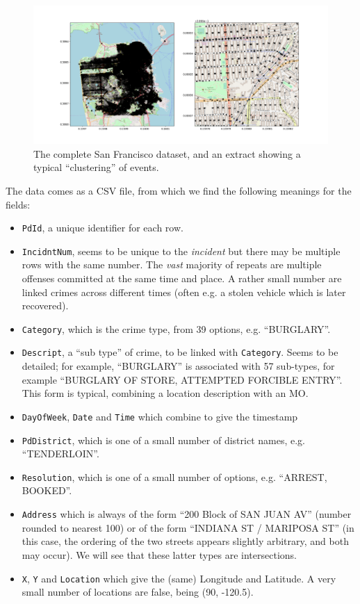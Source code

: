 \documentclass[twoside,a4paper,twocolumn,10pt]{article}
\theoremstyle{plain}
\theoremstyle{definition}
\begin{document}
\begin{figure}
  \includegraphics[width=\textwidth]{SF_overview.png}
  \caption{The complete San Francisco dataset, and an extract showing a typical ``clustering'' of events.}
  \label{fig:two}
\end{figure}

The data comes as a CSV file, from which we find the following meanings for the fields:
\begin{itemize}
\item \texttt{PdId}, a unique identifier for each row.
\item \texttt{IncidntNum}, seems to be unique to the \emph{incident} but there may be multiple
  rows with the same number.  The \emph{vast} majority of repeats are multiple offenses committed at the same time
  and place.  A rather small number are linked crimes across different times (often e.g. a stolen vehicle
  which is later recovered).
\item \texttt{Category}, which is the crime type, from 39 options, e.g. ``BURGLARY''.
\item \texttt{Descript}, a ``sub type'' of crime, to be linked with \texttt{Category}.
  Seems to be detailed; for example, ``BURGLARY'' is associated with 57 sub-types, for example
  ``BURGLARY OF STORE, ATTEMPTED FORCIBLE ENTRY''.  This form is typical, combining a location
  description with an MO.
\item \texttt{DayOfWeek}, \texttt{Date} and \texttt{Time} which combine to give the timestamp
\item \texttt{PdDistrict}, which is one of a small number of district names, e.g. ``TENDERLOIN''.
\item \texttt{Resolution}, which is one of a small number of options, e.g. ``ARREST, BOOKED''.
\item \texttt{Address} which is always of the form ``200 Block of SAN JUAN AV'' (number rounded to
  nearest 100) or of the form ``INDIANA ST / MARIPOSA ST'' (in this case, the ordering of the
  two streets appears slightly arbitrary, and both may occur).  We will see that these latter types
  are intersections.
\item \texttt{X}, \texttt{Y} and \texttt{Location} which give the (same) Longitude and Latitude.
  A very small number of locations are false, being (90, -120.5).
\end{itemize}
\end{document}
